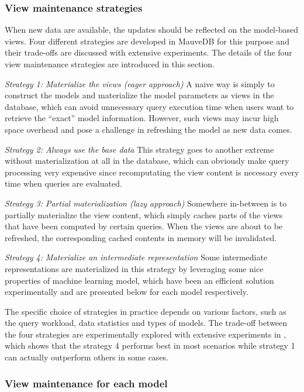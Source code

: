 \subsubsection{View maintenance strategies}
When new data are available, the updates should be reflected on the model-based views. Four different strategies are developed in MauveDB for this purpose and their trade-offs are discussed with extensive experiments. The details of the four view maintenance strategies are introduced in this section.

\textit{Strategy 1: Materialize the views (eager approach)}
A naive way is simply to construct the models and materialize the model parameters as views in the database, which can avoid unnecessary query execution time when users want to retrieve the ``exact'' model information. However, such views may incur high space overhead and pose a challenge in refreshing the model as new data comes.

\textit{Strategy 2: Always use the base data }
This strategy goes to another extreme without materialization at all in the database, which can obviously make query processing very expensive since recomputating the view content is necessary every time when queries are evaluated. 

\textit{Strategy 3: Partial materialization (lazy approach)}
Somewhere in-between is to partially materialize the view content, which simply caches parts of the views that have been computed by certain queries. When the views are about to be refreshed, the corresponding cached contents in memory will be invalidated.

\textit{Strategy 4: Materialize an intermediate representation}
Some intermediate representations are materialized in this strategy by leveraging some nice properties of machine learning model, which have been an efficient solution experimentally and are presented below for each model respectively.

The specific choice of strategies in practice depends on various factors, such as the query workload, data statistics and types of models. The trade-off between the four strategies are experimentally explored with extensive experiments in \cite{deshpande2006mauvedb}, which shows that the strategy 4 performs best in most scenarios while strategy 1 can actually outperform others in some cases.

\subsubsection{View maintenance for each model}\label{sec: view_maintenance_model}
